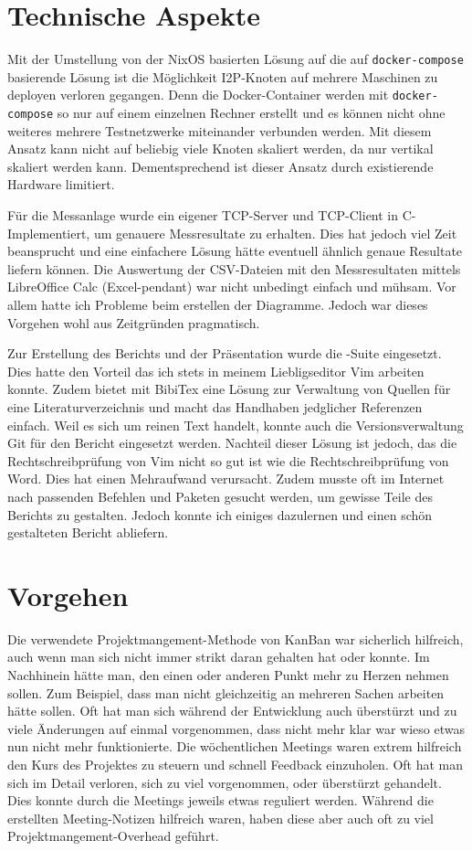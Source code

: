 \section{Technische Aspekte}

Mit der Umstellung von der NixOS basierten Lösung auf die auf \lstinline|docker-compose| basierende Lösung ist
die Möglichkeit I2P-Knoten auf mehrere Maschinen zu deployen verloren gegangen.
Denn die Docker-Container werden mit \lstinline|docker-compose| so nur auf einem einzelnen Rechner erstellt und
es können nicht ohne weiteres mehrere Testnetzwerke miteinander verbunden werden.
Mit diesem Ansatz kann nicht auf beliebig viele Knoten skaliert werden, da nur vertikal skaliert werden kann.
Dementsprechend ist dieser Ansatz durch existierende Hardware limitiert.

Für die Messanlage wurde ein eigener TCP-Server und TCP-Client in C-Implementiert, um genauere Messresultate zu erhalten.
Dies hat jedoch viel Zeit beansprucht und eine einfachere Lösung hätte
eventuell ähnlich genaue Resultate liefern können.
Die Auswertung der CSV-Dateien mit den Messresultaten mittels LibreOffice Calc (Excel-pendant) war nicht unbedingt einfach und mühsam. Vor allem hatte ich Probleme beim erstellen der Diagramme. Jedoch war dieses Vorgehen wohl aus Zeitgründen pragmatisch.

Zur Erstellung des Berichts und der Präsentation wurde die \LaTex-Suite eingesetzt. Dies hatte den Vorteil das ich stets in meinem Liebligseditor Vim arbeiten konnte. Zudem bietet \LaTe  mit BibiTex eine Lösung zur Verwaltung von Quellen für eine Literaturverzeichnis und macht das Handhaben jedglicher Referenzen einfach. Weil es sich um reinen Text handelt, konnte auch die Versionsverwaltung Git für den Bericht eingesetzt werden.
Nachteil dieser Lösung ist jedoch, das die Rechtschreibprüfung von Vim nicht so gut ist wie die Rechtschreibprüfung von Word. Dies hat einen Mehraufwand verursacht. Zudem musste oft im Internet nach passenden Befehlen und Paketen gesucht werden, um gewisse Teile des Berichts zu gestalten.
Jedoch konnte ich einiges dazulernen und einen schön gestalteten Bericht abliefern.


\section{Vorgehen}

Die verwendete Projektmangement-Methode von KanBan war sicherlich hilfreich,
auch wenn man sich nicht immer strikt daran gehalten hat oder konnte.
Im Nachhinein hätte man, den einen oder anderen Punkt mehr zu Herzen nehmen sollen.
Zum Beispiel, dass man nicht gleichzeitig an mehreren Sachen arbeiten hätte sollen.
Oft hat man sich während der Entwicklung auch überstürzt und zu viele Änderungen auf einmal vorgenommen, dass nicht mehr klar war wieso etwas nun nicht mehr funktionierte.
Die wöchentlichen Meetings waren extrem hilfreich den Kurs des Projektes zu steuern und schnell Feedback einzuholen.
Oft hat man sich im Detail verloren, sich zu viel vorgenommen, oder überstürzt gehandelt.
Dies konnte durch die Meetings jeweils etwas reguliert werden.
Während die erstellten Meeting-Notizen hilfreich waren, haben diese aber auch oft zu viel Projektmangement-Overhead geführt.

